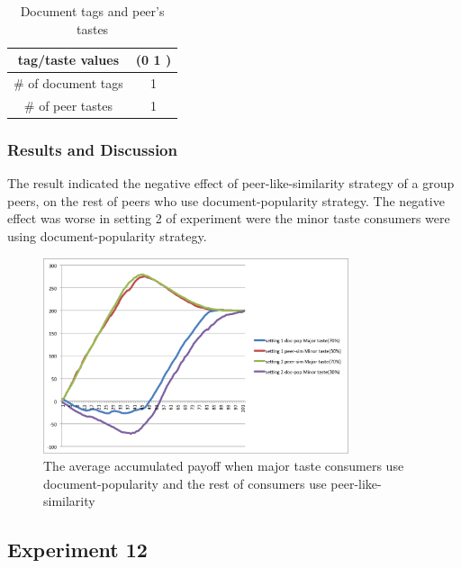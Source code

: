 \documentclass [12pt]{article} \usepackage{multicol}
\begin{document}
\begin{table}[h!]
\caption{Document tags and peer's tastes}

\begin{center}

\begin{tabular}{|c|c|}
\hline tag/taste values & (0 1 )\\
\hline \# of document tags   &  1\\ \hline 
\# of peer tastes  &  1 \\ \hline 
\end{tabular}

\end{center}
\label{default}
\end{table}



\subsubsection{Results and Discussion}

The result indicated the negative effect of peer-like-similarity strategy of a group peers,
on the rest of peers who use document-popularity strategy. The negative effect was worse in
setting 2 of experiment were the minor taste consumers were using document-popularity strategy. 


\begin{figure}[h!]
\begin{center}
\includegraphics[width=0.8\textwidth,center]{images/EXP11-doc-pop-peer-sim-MajorMinor}
\caption{The average accumulated payoff when major taste consumers use document-popularity and the rest of consumers use peer-like-similarity}
\end{center}
\end{figure}

\subsection{Experiment 12}
\end{document}
